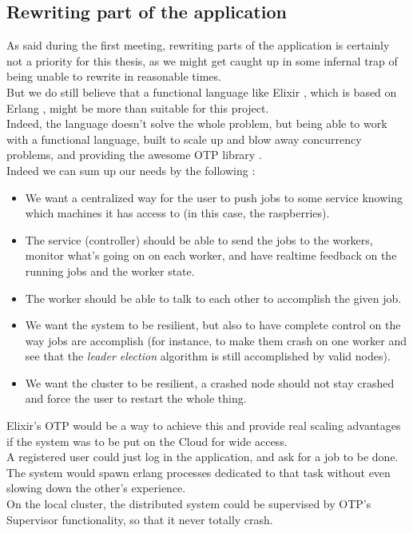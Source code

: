 \documentclass{article}
\begin{document}
  \subsection{Rewriting part of the application}

    As said during the first meeting, rewriting parts of the application
    is certainly not a priority for this thesis, as we might get caught up in
    some infernal trap of being unable to rewrite in reasonable times.\\

    But we do still believe that a functional language like Elixir \cite{elixir}, which
    is based on Erlang \cite{erlang}, might be more than suitable for this project.\\
    Indeed, the language doesn't solve the whole problem, but being able to
    work with a functional language, built to scale up and blow away concurrency
    problems, and providing the awesome OTP library \cite{otp}.\\

    Indeed we can sum up our needs by the following : \\
    \begin{itemize}
      \item We want a centralized way for the user to push jobs to some service
      knowing which machines it has access to (in this case, the raspberries).
      \item The service (controller) should be able to send the jobs to the workers,
      monitor what's going on on each worker, and have realtime feedback on the
      running jobs and the worker state.
      \item The worker should be able to talk to each other to accomplish the
      given job.
      \item We want the system to be resilient, but also to have complete
      control on the way jobs are accomplish (for instance, to make them
      crash on one worker and see that the \textit{leader election} algorithm
      is still accomplished by valid nodes).
      \item We want the cluster to be resilient, a crashed node should not stay crashed
      and force the user to restart the whole thing.
    \end{itemize}

    Elixir's OTP would be a way to achieve this and provide real scaling advantages
    if the system was to be put on the Cloud for wide access.\\
    A registered user could just log in the application, and ask for a job to be
    done. The system would spawn erlang processes dedicated to that task without
    even slowing down the other's experience.\\

    On the local cluster, the distributed system could be supervised by
    OTP's Supervisor \cite{elixirsupervisor} functionality, so that it never
    totally crash.\\


\nocite{*}


\end{document}

